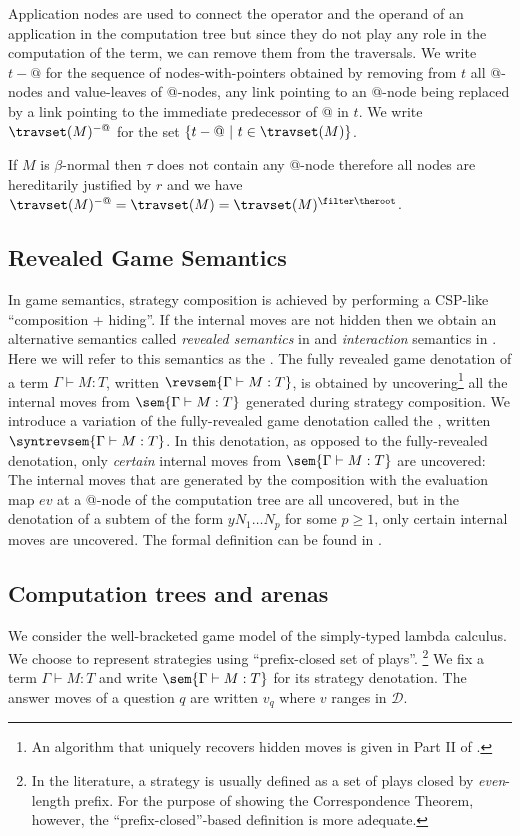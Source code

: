 Application nodes are used to connect the operator and the operand of an application in the computation tree but since they do not play any role in the computation of the term, we can remove them from the traversals.  We write $t-@$ for the sequence of nodes-with-pointers obtained by removing from $t$ all @-nodes and value-leaves of @-nodes, any link pointing to an @-node being replaced by a link pointing to the immediate predecessor of @ in $t$. We write $\travset(M)^{-@}$ for the set $\{ t - @ \ | \  t \in \travset(M) \}$.
\begin{remark}
If $M$ is $\beta$-normal then $\tau$ does not contain any @-node therefore all nodes are hereditarily justified by $r$ and we have $\travset(M)^{-@} = \travset(M) = \travset(M)^{\filter \theroot }$.
\end{remark}

\subsection{Revealed Game Semantics}

In game semantics, strategy composition is achieved by performing a CSP-like ``composition + hiding''. If the internal moves are not hidden then we obtain an alternative semantics called \emph{revealed semantics} in \cite{willgreenlandthesis} and \emph{interaction} semantics in \cite{DBLP:conf/sas/DimovskiGL05}. Here we will refer to this semantics as the . The fully revealed game denotation of a term $\Gamma \vdash M :T$, written $\revsem{\Gamma \vdash M : T}$, is obtained by uncovering\footnote{An algorithm that uniquely recovers hidden moves is given in Part II of
  \cite{hylandong_pcf}.} all the internal moves from $\sem{\Gamma \vdash
  M : T}$ generated during strategy composition.
We introduce a variation of the fully-revealed game denotation called the , written $\syntrevsem{\Gamma \vdash
  M : T}$. In this denotation, as opposed to the fully-revealed denotation,
only \emph{certain} internal moves from $\sem{\Gamma \vdash
  M : T}$ are uncovered: The internal moves that are generated by the composition with the evaluation map
$ev$ at a @-node of the computation tree are all uncovered, but in the denotation of a subtem of the form $y N_1 \ldots N_p$ for some $p\geq1$, only certain internal moves are uncovered. The formal definition can be found in \cite{localbeta2008}.

\subsection{Computation trees and arenas}
We consider the well-bracketed game model of the simply-typed lambda calculus.  We choose to represent strategies using ``prefix-closed set of plays''. \footnote{In the literature, a strategy is usually defined as a set of plays closed by \emph{even}-length prefix. For the purpose of showing the Correspondence Theorem, however, the ``prefix-closed''-based definition is more adequate.} We fix a term $\Gamma \vdash M : T$ and write $\sem{\Gamma \vdash M : T}$ for its strategy denotation. The answer moves of a question $q$ are written $v_q$ where $v$ ranges in $\mathcal{D}$.

